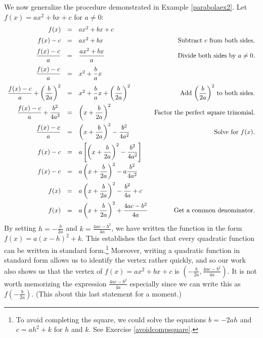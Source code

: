 \pagebreak

We now generalize the procedure demonstrated in Example \ref{parabolaex2}.  Let $f(x) = ax^2 + bx + c$ for $a \neq 0$: \[ \begin{array}{rclr}

f(x) & = & ax^2 + bx +c \\ [5pt]
f(x) - c & = &  ax^2 + bx & \text{Subtract $c$ from both sides.}\\ [5pt]
\dfrac{f(x)-c}{a}    & =  & \dfrac{ax^2 + bx}{a} &  \text{Divide both sides by $a \neq 0$.} \\ [10pt]
\dfrac{f(x)-c}{a}    & =  & x^2 + \dfrac{b}{a} x  & \\ [10pt]
\dfrac{f(x)-c}{a} + \left(\dfrac{b}{2a}\right)^2   & = & x^2 + \dfrac{b}{a} x + \left(\dfrac{b}{2a}\right)^2  & \text{Add $ \left(\dfrac{b}{2a}\right)^2  $ to both sides.}\\ [10pt]
\dfrac{f(x)-c}{a}  + \dfrac{b^2}{4a^2}    & = & \left(x + \dfrac{b}{2a}\right)^2  & \text{Factor the perfect square trinomial.} \\ [10pt]
\dfrac{f(x)-c}{a}    & =  & \left(x + \dfrac{b}{2a}\right)^2   -  \dfrac{b^2}{4a^2} & \text{Solve for $f(x)$.}\\ [10pt]
f(x)-c & = & a \left[ \left(x + \dfrac{b}{2a}\right)^2   -  \dfrac{b^2}{4a^2}\right] & \\ [10pt]
f(x)-c & = & a\left(x + \dfrac{b}{2a}\right)^2   -  a\dfrac{b^2}{4a^2} &  \\ [10pt]
f(x) & = & a\left(x + \dfrac{b}{2a}\right)^2 - \dfrac{b^2}{4a} + c  & \\ [10pt]
f(x) & = & a\left(x + \dfrac{b}{2a}\right)^2  + \dfrac{4ac - b^2}{4a}  & \text{Get a common denominator.} \\
    
\end{array}\] By setting $h = -\frac{b}{2a}$ and $k = \frac{4ac - b^2}{4a}$, we have written the function in the form $f(x) = a(x-h)^2 + k$.  This establishes the fact that every quadratic function can be written in standard form.\footnote{To avoid completing the square, we could solve the equations  $b = -2ah$ and $c = ah^2 + k $ for $h$ and $k$.  See Exercise \ref{avoidcompsquare}.}   Moreover, writing a quadratic function in standard form allows us to identify the vertex rather quickly, and so our work also shows us that the vertex of $f(x) = ax^2+bx+c$ is $\left(-\frac{b}{2a}, \frac{4ac - b^2}{4a}\right)$.  It is not worth memorizing the expression $\frac{4ac - b^2}{4a}$ especially since we can write this as $f\left(-\frac{b}{2a}\right)$.  (This about this last statement for a moment.)

